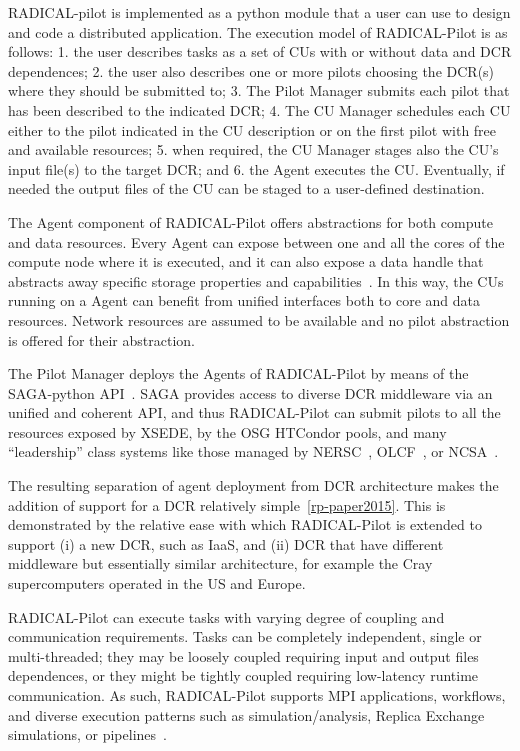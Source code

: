\documentclass{sig-alternate}
\begin{document}
RADICAL-pilot is implemented as a python module that a user can use to design
and code a distributed application. The execution model of RADICAL-Pilot is as
follows: 1. the user describes tasks as a set of CUs with or without data and
DCR dependences; 2. the user also describes one or more pilots choosing the
DCR(s) where they should be submitted to; 3. The Pilot Manager submits each
pilot that has been described to the indicated DCR; 4. The CU Manager schedules
each CU either to the pilot indicated in the CU description or on the first
pilot with free and available resources; 5. when required, the CU Manager stages
also the CU's input file(s) to the target DCR; and 6. the Agent executes the CU.
Eventually, if needed the output files of the CU can be staged to a user-defined
destination. 


The Agent component of RADICAL-Pilot offers abstractions for both compute and
data resources. Every Agent can expose between one and all the cores of the
compute node where it is executed, and it can also expose a data handle that
abstracts away specific storage properties and capabilities~\cite{luckow2010}.
In this way, the CUs running on a Agent can benefit from unified interfaces both
to core and data resources. Network resources are assumed to be available and no
pilot abstraction is offered for their abstraction.

The Pilot Manager deploys the Agents of RADICAL-Pilot by means of the
SAGA-python API~\cite{sagax}. SAGA provides access to diverse DCR middleware via
an unified and coherent API, and thus RADICAL-Pilot can submit pilots to all the
resources exposed by XSEDE, by the OSG HTCondor pools, and many ``leadership''
class systems like those managed by NERSC~\cite{nersc_url},
OLCF~\cite{olcf_url}, or NCSA~\cite{ncsa_url}.

The resulting separation of agent deployment from DCR architecture makes the
addition of support for a DCR relatively simple~\ref{rp-paper2015}. This is
demonstrated by the relative ease with which RADICAL-Pilot is extended to
support (i) a new DCR, such as IaaS, and (ii) DCR that have different middleware
but essentially similar architecture, for example the Cray supercomputers
operated in the US and Europe.

RADICAL-Pilot can execute tasks with varying degree of coupling and
communication requirements. Tasks can be completely independent, single or
multi-threaded; they may be loosely coupled requiring input and output files
dependences, or they might be tightly coupled requiring low-latency runtime
communication. As such, RADICAL-Pilot supports MPI applications, workflows, and
diverse execution patterns such as simulation/analysis, Replica Exchange
simulations, or pipelines~\cite{emdtoolkit_url}.
\end{document}
